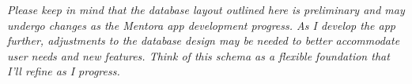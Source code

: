 \documentclass[12pt]{article} %
\begin{document}
\textit{Please keep in mind that the database layout outlined here is preliminary and may undergo changes as the Mentora app development progress. As I develop the app further, adjustments to the database design may be needed to better accommodate user needs and new features. Think of this schema as a flexible foundation that I'll refine as I progress.}

\end{document}
